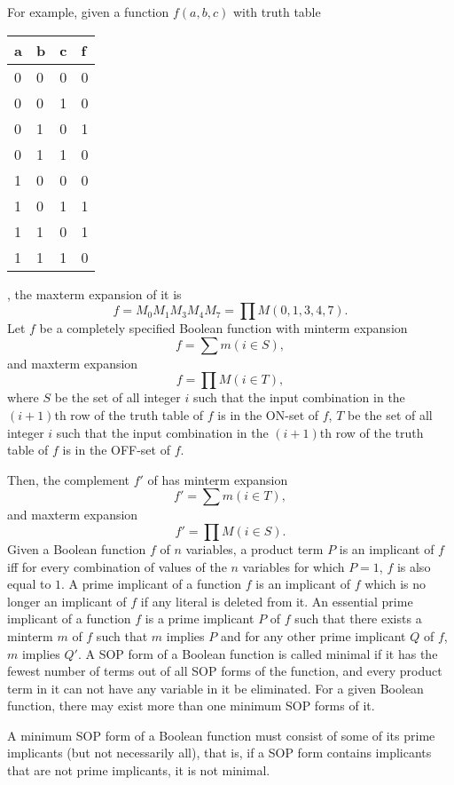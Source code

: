 \documentclass[a4paper,12pt]{report}
\begin{document}
\begin{itemize}
\begin{itemize}
\begin{itemize}
\begin{itemize}
\begin{itemize}
\begin{itemize}
\begin{itemize}
\begin{itemize}
For example, given a function $f(a,b,c)$ with truth table
\begin{longtable}[c]{|m|m|m|m|}
\hline
a & b & c & f\\\hline
0 & 0 & 0 & 0\\\hline
0 & 0 & 1 & 0\\\hline
0 & 1 & 0 & 1\\\hline
0 & 1 & 1 & 0\\\hline
1 & 0 & 0 & 0\\\hline
1 & 0 & 1 & 1\\\hline
1 & 1 & 0 & 1\\\hline
1 & 1 & 1 & 0\\\hline
\end{longtable}
, the maxterm expansion of it is
\[f=M_0M_1M_3M_4M_7=\prod M(0,1,3,4,7).\]
Let $f$ be a completely specified Boolean function with minterm expansion
\[f=\sum m(i\in S),\]
and maxterm expansion
\[f=\prod M(i\in T),\]
where $S$ be the set of all integer $i$ such that the input combination in the $(i+1)$th row of the truth table of $f$ is in the ON-set of $f$, $T$ be the set of all integer $i$ such that the input combination in the $(i+1)$th row of the truth table of $f$ is in the OFF-set of $f$.

Then, the complement $f'$ of has minterm expansion 
\[f'=\sum m(i\in T),\]
and maxterm expansion
\[f'=\prod M(i\in S).\]
Given a Boolean function $f$ of $n$ variables, a product term $P$ is an implicant of $f$ iff for every combination of values of the $n$ variables for which $P = 1$, $f$ is also equal to $1$.
A prime implicant of a function $f$ is an implicant of $f$ which is no longer an implicant of $f$ if any literal is deleted from it.
An essential prime implicant of a function $f$ is a prime implicant $P$ of $f$ such that there exists a minterm $m$ of $f$ such that $m$ implies $P$ and for any other prime implicant $Q$ of $f$, $m$ implies $Q'$.
A SOP form of a Boolean function is called minimal if it has the fewest number of terms out of all SOP forms of the function, and every product term in it can not have any variable in it be eliminated. For a given Boolean function, there may exist more than one minimum SOP forms of it.

A minimum SOP form of a Boolean function must consist of some of its prime implicants (but not necessarily all), that is, if a SOP form contains implicants that are not prime implicants, it is not minimal.


\end{itemize}
\end{itemize}
\end{itemize}
\end{itemize}
\end{itemize}
\end{itemize}
\end{itemize}
\end{itemize}
\end{document}
